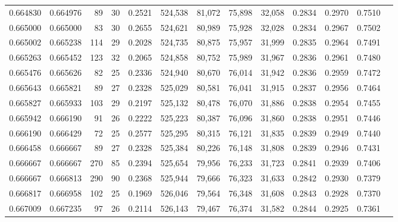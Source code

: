 \begin{tabular}{rrrrrrrrrrrrr}
0.664830 & 0.664976 &     89 &    30 &                                     0.2521 & 524,538 &  81,072 &  75,898 &  32,058 & 0.2834 & 0.2970 & 0.7510 \\
0.665000 & 0.665000 &     83 &    30 &                                     0.2655 & 524,621 &  80,989 &  75,928 &  32,028 & 0.2834 & 0.2967 & 0.7502 \\
0.665002 & 0.665238 &    114 &    29 &                                     0.2028 & 524,735 &  80,875 &  75,957 &  31,999 & 0.2835 & 0.2964 & 0.7491 \\
0.665263 & 0.665452 &    123 &    32 &                                     0.2065 & 524,858 &  80,752 &  75,989 &  31,967 & 0.2836 & 0.2961 & 0.7480 \\
0.665476 & 0.665626 &     82 &    25 &                                     0.2336 & 524,940 &  80,670 &  76,014 &  31,942 & 0.2836 & 0.2959 & 0.7472 \\
0.665643 & 0.665821 &     89 &    27 &                                     0.2328 & 525,029 &  80,581 &  76,041 &  31,915 & 0.2837 & 0.2956 & 0.7464 \\
0.665827 & 0.665933 &    103 &    29 &                                     0.2197 & 525,132 &  80,478 &  76,070 &  31,886 & 0.2838 & 0.2954 & 0.7455 \\
0.665942 & 0.666190 &     91 &    26 &                                     0.2222 & 525,223 &  80,387 &  76,096 &  31,860 & 0.2838 & 0.2951 & 0.7446 \\
0.666190 & 0.666429 &     72 &    25 &                                     0.2577 & 525,295 &  80,315 &  76,121 &  31,835 & 0.2839 & 0.2949 & 0.7440 \\
0.666458 & 0.666667 &     89 &    27 &                                     0.2328 & 525,384 &  80,226 &  76,148 &  31,808 & 0.2839 & 0.2946 & 0.7431 \\
0.666667 & 0.666667 &    270 &    85 &                                     0.2394 & 525,654 &  79,956 &  76,233 &  31,723 & 0.2841 & 0.2939 & 0.7406 \\
0.666667 & 0.666813 &    290 &    90 &                                     0.2368 & 525,944 &  79,666 &  76,323 &  31,633 & 0.2842 & 0.2930 & 0.7379 \\
0.666817 & 0.666958 &    102 &    25 &                                     0.1969 & 526,046 &  79,564 &  76,348 &  31,608 & 0.2843 & 0.2928 & 0.7370 \\
0.667009 & 0.667235 &     97 &    26 &                                     0.2114 & 526,143 &  79,467 &  76,374 &  31,582 & 0.2844 & 0.2925 & 0.7361 \\

\end{tabular}
